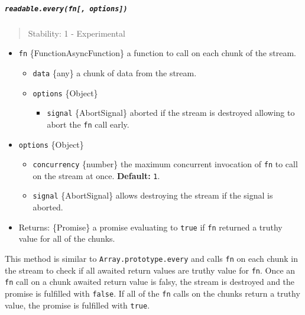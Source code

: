 \subparagraph{\texorpdfstring{\texttt{readable.every(fn{[},\ options{]})}}{readable.every(fn{[}, options{]})}}\label{readable.everyfn-options}

\begin{quote}
Stability: 1 - Experimental
\end{quote}

\begin{itemize}
\tightlist
\item
  \texttt{fn} \{Function\textbar AsyncFunction\} a function to call on
  each chunk of the stream.

  \begin{itemize}
  \tightlist
  \item
    \texttt{data} \{any\} a chunk of data from the stream.
  \item
    \texttt{options} \{Object\}

    \begin{itemize}
    \tightlist
    \item
      \texttt{signal} \{AbortSignal\} aborted if the stream is destroyed
      allowing to abort the \texttt{fn} call early.
    \end{itemize}
  \end{itemize}
\item
  \texttt{options} \{Object\}

  \begin{itemize}
  \tightlist
  \item
    \texttt{concurrency} \{number\} the maximum concurrent invocation of
    \texttt{fn} to call on the stream at once. \textbf{Default:}
    \texttt{1}.
  \item
    \texttt{signal} \{AbortSignal\} allows destroying the stream if the
    signal is aborted.
  \end{itemize}
\item
  Returns: \{Promise\} a promise evaluating to \texttt{true} if
  \texttt{fn} returned a truthy value for all of the chunks.
\end{itemize}

This method is similar to \texttt{Array.prototype.every} and calls
\texttt{fn} on each chunk in the stream to check if all awaited return
values are truthy value for \texttt{fn}. Once an \texttt{fn} call on a
chunk awaited return value is falsy, the stream is destroyed and the
promise is fulfilled with \texttt{false}. If all of the \texttt{fn}
calls on the chunks return a truthy value, the promise is fulfilled with
\texttt{true}.

